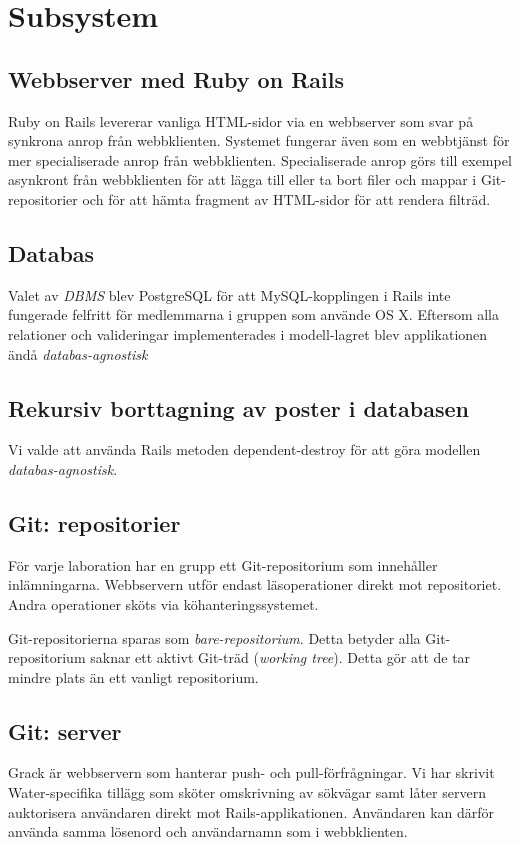 \section{Subsystem}
\subsection{Webbserver med Ruby on Rails}
Ruby on Rails levererar vanliga HTML-sidor via en webbserver som svar på synkrona anrop från webbklienten. Systemet fungerar även som en webbtjänst för mer specialiserade anrop från webbklienten. Specialiserade anrop görs till exempel asynkront från webbklienten för att lägga till eller ta bort filer och mappar i Git-repositorier och för att hämta fragment av HTML-sidor för att rendera filträd.
\subsection{Databas}
Valet av \emph{DBMS} blev PostgreSQL för att MySQL-kopplingen i Rails inte fungerade felfritt för medlemmarna i gruppen som använde OS X. Eftersom alla relationer och valideringar implementerades i modell-lagret blev applikationen ändå \emph{databas-agnostisk}
\subsection{Rekursiv borttagning av poster i databasen}
Vi valde att använda Rails metoden dependent-destroy för att göra modellen \emph{databas-agnostisk}.
\subsection{Git: repositorier}
För varje laboration har en grupp ett Git-repositorium som innehåller inlämningarna. Webbservern utför endast läsoperationer direkt mot repositoriet. Andra operationer sköts via köhanteringssystemet.

Git-repositorierna sparas som \emph{bare-repositorium}. Detta betyder alla Git-repositorium saknar ett aktivt Git-träd (\emph{working tree}). Detta gör att de tar mindre plats än ett vanligt repositorium.
\subsection{Git: server}
Grack är webbservern som hanterar push- och pull-förfrågningar. Vi har skrivit Water-specifika tillägg som sköter omskrivning av sökvägar samt låter servern auktorisera användaren direkt mot Rails-applikationen. Användaren kan därför använda samma lösenord och användarnamn som i webbklienten.

